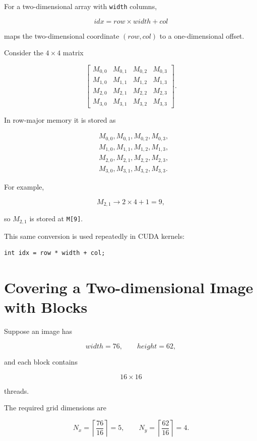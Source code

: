 \documentclass[11pt,a4paper]{article}
\begin{document}
For a two-dimensional array with \texttt{width} columns,

\[
\boxed{
idx = row\times width + col
}
\]

maps the two-dimensional coordinate \((row,col)\) to a one-dimensional offset.

Consider the \(4\times4\) matrix

\[
\begin{bmatrix}
M_{0,0} & M_{0,1} & M_{0,2} & M_{0,3}\\
M_{1,0} & M_{1,1} & M_{1,2} & M_{1,3}\\
M_{2,0} & M_{2,1} & M_{2,2} & M_{2,3}\\
M_{3,0} & M_{3,1} & M_{3,2} & M_{3,3}
\end{bmatrix}.
\]

In row-major memory it is stored as

\[
\begin{aligned}
&M_{0,0},M_{0,1},M_{0,2},M_{0,3},\\
&M_{1,0},M_{1,1},M_{1,2},M_{1,3},\\
&M_{2,0},M_{2,1},M_{2,2},M_{2,3},\\
&M_{3,0},M_{3,1},M_{3,2},M_{3,3}.
\end{aligned}
\]

For example,

\[
M_{2,1}
\longrightarrow
2\times4+1
=
9,
\]

so \(M_{2,1}\) is stored at \texttt{M[9]}.

This same conversion is used repeatedly in CUDA kernels:

\begin{lstlisting}
int idx = row * width + col;
\end{lstlisting}

\section{Covering a Two-dimensional Image with Blocks}

Suppose an image has

\[
width=76,
\qquad
height=62,
\]

and each block contains

\[
16\times16
\]

threads.

The required grid dimensions are

\[
N_x
=
\left\lceil\frac{76}{16}\right\rceil
=
5,
\qquad
N_y
=
\left\lceil\frac{62}{16}\right\rceil
=
4.
\]
\end{document}
